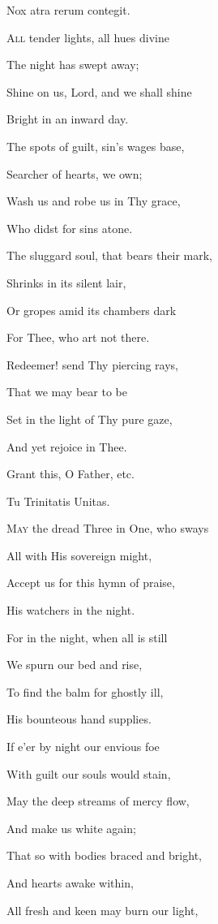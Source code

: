 
Nox atra rerum contegit.

A\textsc{ll} tender lights, all hues divine

The night has swept away;

Shine on us, Lord, and we shall shine

Bright in an inward day.

The spots of guilt, sin's wages base,

Searcher of hearts, we own;

Wash us and robe us in Thy grace,

Who didst for sins atone.

The sluggard soul, that bears their mark,

Shrinks in its silent lair,

Or gropes amid its chambers dark

For Thee, who art not there. 

Redeemer! send Thy piercing rays,

That we may bear to be

Set in the light of Thy pure gaze,

And yet rejoice in Thee.

Grant this, O Father, etc.


Tu Trinitatis Unitas.

M\textsc{ay} the dread Three in One, who sways

All with His sovereign might,

Accept us for this hymn of praise,

His watchers in the night.

For in the night, when all is still

We spurn our bed and rise,

To find the balm for ghostly ill,

His bounteous hand supplies.

If e'er by night our envious foe

With guilt our souls would stain,

May the deep streams of mercy flow,

And make us white again; 

That so with bodies braced and bright,

And hearts awake within,

All fresh and keen may burn our light,

